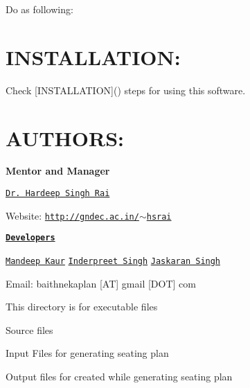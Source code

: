 Do as following\-: 


\section*{I\-N\-S\-T\-A\-L\-L\-A\-T\-I\-O\-N\-:}

Check \mbox{[}I\-N\-S\-T\-A\-L\-L\-A\-T\-I\-O\-N\mbox{]}() steps for using this software.

\section*{A\-U\-T\-H\-O\-R\-S\-:}

{\bfseries Mentor and Manager}

\href{https://github.com/hsrai}{\tt Dr. Hardeep Singh Rai}

Website\-: \href{http://gndec.ac.in/~hsrai}{\tt http\-://gndec.\-ac.\-in/$\sim$hsrai}

{\bfseries \href{https://github.com/GreatDevelopers/bakaplan/wiki/Contributors}{\tt Developers}}

\href{https://github.com/megha55}{\tt Mandeep Kaur} \href{https://github.com/inderpreetsingh}{\tt Inderpreet Singh} \href{https://github.com/Jaskaran28193}{\tt Jaskaran Singh}

Email\-: baithnekaplan \mbox{[}A\-T\mbox{]} gmail \mbox{[}D\-O\-T\mbox{]} com

This directory is for executable files

Source files

Input Files for generating seating plan

Output files for created while generating seating plan 